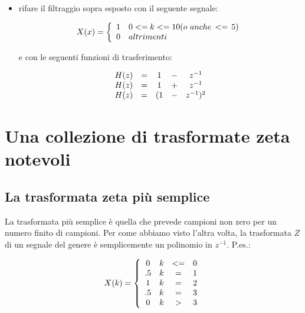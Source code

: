 \begin{itemize}
 
 \item rifare il filtraggio sopra esposto con il seguente segnale:

				 \begin{equation}
						X(x) = \left\{
						   \begin{array}{c l}
									1 & 0 <= k <= 10 (o\,\,anche\,<=\,5)\\
									0 & altrimenti\\
							 \end{array} \right.
		     \end{equation}
 
       e con le seguenti funzioni di trasferimento:
 
			 	\begin{equation}
					\begin{array}{c c c c c}
	  				H(z) & = & 1 & - & z^{-1}\\
						 H(z) & = & 1 & + & z^{-1}\\
             H(z) & = & ( 1 & - & z^{-1} )^2\\
	      	 \end{array}
	       \end{equation}

\end{itemize}

\section{Una collezione di trasformate zeta notevoli\label{sec:zeta notevoli}}

\subsection{La trasformata zeta pi\`u semplice}

		La trasformata pi\`u semplice \`e quella che prevede campioni  non  zero  per  un
     numero finito di campioni. Per come abbiamo visto l'altra volta, la
     trasformata  $Z$  di  un  segnale  del  genere  \`e  semplicemente  un
     polinomio in $z^{-1}$. P.es.:

		 \begin{equation}
				X(k) = \left\{
					\begin{array}{c c c c}
						0 & k & <= & 0\\
						.5 & k & = & 1\\
						1 & k & = & 2\\
						.5 & k & = & 3\\
						0 & k & > & 3\\
		\end{array} \right.
		 \end{equation}

